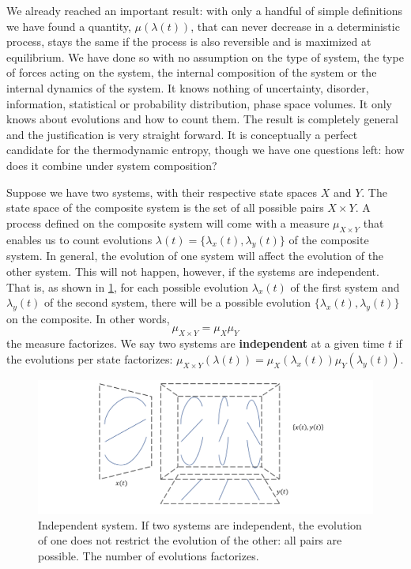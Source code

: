 \documentclass[letterpaper,twocolumn]{article}
\begin{document}
We already reached an important result: with only a handful of simple definitions we have found a quantity, $\mu(\lambda(t))$, that can never decrease in a deterministic process, stays the same if the process is also reversible and is maximized at equilibrium. We have done so with no assumption on the type of system, the type of forces acting on the system, the internal composition of the system or the internal dynamics of the system. It knows nothing of uncertainty, disorder, information, statistical or probability distribution, phase space volumes. It only knows about evolutions and how to count them. The result is completely general and the justification is very straight forward. It is conceptually a perfect candidate for the thermodynamic entropy, though we have one questions left: how does it combine under system composition?

Suppose we have two systems, with their respective state spaces $X$ and $Y$. The state space of the composite system is the set of all possible pairs $X \times Y$. A process defined on the composite system will come with a measure $\mu_{X \times Y}$ that enables us to count evolutions $\lambda(t) = \{\lambda_x(t), \lambda_y(t)\}$ of the composite system. In general, the evolution of one system will affect the evolution of the other system. This will not happen, however, if the systems are independent. That is, as shown in \ref{fig_independence}, for each possible evolution $\lambda_x(t)$ of the first system and $\lambda_y(t)$ of the second system, there will be a possible evolution $\{\lambda_x(t), \lambda_y(t)\}$ on the composite. In other words,
\begin{equation}
	\mu_{X \times Y} = \mu_X \mu_Y
\end{equation}
the measure factorizes. We say two systems are \textbf{independent} at a given time $t$ if the evolutions per state factorizes: $\mu_{X \times Y}(\lambda(t)) = \mu_X (\lambda_x(t)) \mu_Y (\lambda_y(t))$.

\begin{figure}[h]
	\includegraphics[width=\columnwidth]{images/Slide7.png}
	\caption{Independent system. If two systems are independent, the evolution of one does not restrict the evolution of the other: all pairs are possible. The number of evolutions factorizes.}\label{fig_independence}
\end{figure}
\end{document}

